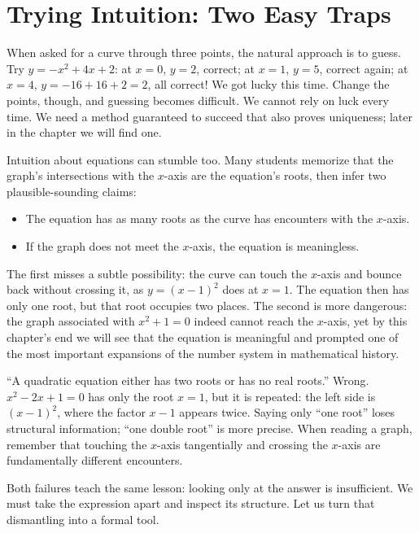 \section{Trying Intuition: Two Easy Traps}

When asked for a curve through three points, the natural approach is to guess. Try $y = -x^2 + 4x + 2$: at $x=0$, $y=2$, correct; at $x=1$, $y=5$, correct again; at $x=4$, $y = -16+16+2 = 2$, all correct! We got lucky this time. Change the points, though, and guessing becomes difficult. We cannot rely on luck every time. We need a method guaranteed to succeed that also proves uniqueness; later in the chapter we will find one.

Intuition about equations can stumble too. Many students memorize that the graph's intersections with the $x$-axis are the equation's roots, then infer two plausible-sounding claims:

\begin{itemize}
\item The equation has as many roots as the curve has encounters with the $x$-axis.
\item If the graph does not meet the $x$-axis, the equation is meaningless.
\end{itemize}

The first misses a subtle possibility: the curve can touch the $x$-axis and bounce back without crossing it, as $y=(x-1)^2$ does at $x=1$. The equation then has only one root, but that root occupies two places. The second is more dangerous: the graph associated with $x^2+1=0$ indeed cannot reach the $x$-axis, yet by this chapter's end we will see that the equation is meaningful and prompted one of the most important expansions of the number system in mathematical history.

\begin{fanli}
``A quadratic equation either has two roots or has no real roots.'' Wrong. $x^2-2x+1=0$ has only the root $x=1$, but it is repeated: the left side is $(x-1)^2$, where the factor $x-1$ appears twice. Saying only ``one root'' loses structural information; ``one double root'' is more precise. When reading a graph, remember that touching the $x$-axis tangentially and crossing the $x$-axis are fundamentally different encounters.
\end{fanli}

Both failures teach the same lesson: looking only at the answer is insufficient. We must take the expression apart and inspect its structure. Let us turn that dismantling into a formal tool.

